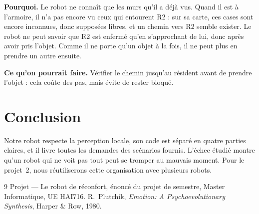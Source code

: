 \documentclass[11pt,a4paper]{article}
\begin{document}
\textbf{Pourquoi.} Le robot ne connaît que les murs qu'il a déjà vus. Quand il est à l'armoire, il n'a pas encore vu ceux qui entourent R2 : sur sa carte, ces cases sont encore inconnues, donc supposées libres, et un chemin vers R2 semble exister. Le robot ne peut savoir que R2 est enfermé qu'en s'approchant de lui, donc après avoir pris l'objet. Comme il ne porte qu'un objet à la fois, il ne peut plus en prendre un autre ensuite.

\textbf{Ce qu'on pourrait faire.} Vérifier le chemin jusqu'au résident avant de prendre l'objet : cela coûte des pas, mais évite de rester bloqué.

\section{Conclusion}

Notre robot respecte la perception locale, son code est séparé en quatre parties claires, et il livre toutes les demandes des scénarios fournis. L'échec étudié montre qu'un robot qui ne voit pas tout peut se tromper au mauvais moment. Pour le projet~2, nous réutiliserons cette organisation avec plusieurs robots.

\begin{thebibliography}{9}\small
{} Projet --- Le robot de réconfort, énoncé du projet de semestre, Master Informatique, UE HAI716.
 R.~Plutchik, \emph{Emotion: A Psychoevolutionary Synthesis}, Harper \& Row, 1980.
\end{thebibliography}
\end{document}
